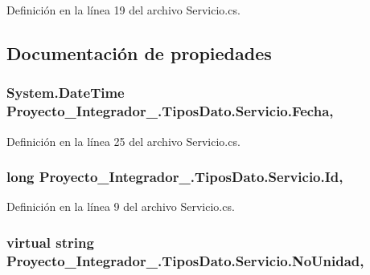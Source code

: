 Definición en la línea 19 del archivo Servicio.\-cs.



\subsection{Documentación de propiedades}
\hypertarget{class_proyecto___integrador__3_1_1_tipos_dato_1_1_servicio_adfd9654485b999c795437dee578fac98}{
\subsubsection[{Fecha}]{\setlength{\rightskip}{0pt plus 5cm}System.\-Date\-Time Proyecto\-\_\-\-Integrador\-\_.\-Tipos\-Dato.\-Servicio.\-Fecha\hspace{0.3cm}{\ttfamily [get]}, {\ttfamily [set]}}}\label{class_proyecto___integrador__3_1_1_tipos_dato_1_1_servicio_adfd9654485b999c795437dee578fac98}


Definición en la línea 25 del archivo Servicio.\-cs.

\hypertarget{class_proyecto___integrador__3_1_1_tipos_dato_1_1_servicio_a81c451c62cc6b77b6f80614df5ffb80d}{
\subsubsection[{Id}]{\setlength{\rightskip}{0pt plus 5cm}long Proyecto\-\_\-\-Integrador\-\_.\-Tipos\-Dato.\-Servicio.\-Id\hspace{0.3cm}{\ttfamily [get]}, {\ttfamily [set]}}}\label{class_proyecto___integrador__3_1_1_tipos_dato_1_1_servicio_a81c451c62cc6b77b6f80614df5ffb80d}


Definición en la línea 9 del archivo Servicio.\-cs.

\hypertarget{class_proyecto___integrador__3_1_1_tipos_dato_1_1_servicio_abb92d5f6f972c2df3a7cbe4d25b713e8}{
\subsubsection[{No\-Unidad}]{\setlength{\rightskip}{0pt plus 5cm}virtual string Proyecto\-\_\-\-Integrador\-\_.\-Tipos\-Dato.\-Servicio.\-No\-Unidad\hspace{0.3cm}{\ttfamily [get]}, {\ttfamily [set]}}}\label{class_proyecto___integrador__3_1_1_tipos_dato_1_1_servicio_abb92d5f6f972c2df3a7cbe4d25b713e8}


